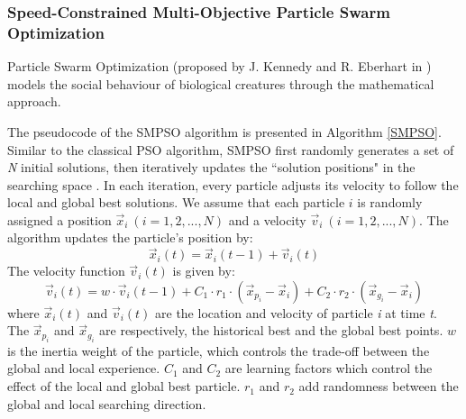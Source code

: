 \documentclass[10pt,journal,compsoc]{IEEEtran}
\begin{document}
\subsubsection{Speed-Constrained Multi-Objective Particle Swarm Optimization}
Particle Swarm Optimization (proposed by J. Kennedy and R. Eberhart in \cite{poli2017}) models the social behaviour of biological creatures through the mathematical approach.

The pseudocode of the SMPSO algorithm is presented in Algorithm \ref{SMPSO}.
Similar to the classical PSO algorithm, SMPSO first randomly generates a set of \textit{N} initial solutions, then iteratively updates the ``solution positions" in the searching space \cite{smpso}.
In each iteration, every particle adjusts its velocity to follow the local and global best solutions. We assume that each particle $i$ is randomly assigned a position $\vec{x}_i\ (i=1, 2, ..., N)$ and a velocity $\vec{v}_i\ (i=1,2,...,N)$. The algorithm updates the particle's position by:
\begin{equation}\label{psoposition}
\vec{x}_i(t) = \vec{x}_i(t-1) + \vec{v}_i(t)
\end{equation}
The velocity function $\vec{v}_i(t)$ is given by:
\begin{equation}\label{psospeed}
\vec{v}_i(t) = w \cdot \vec{v}_i(t-1) + C_1 \cdot r_1 \cdot (\vec{x}_{p_i}- \vec{x}_i)+ C_2 \cdot r_2 \cdot (\vec{x}_{g_i} - \vec{x}_i)
\end{equation}
where $\vec{x}_i(t)$ and $\vec{v}_i(t)$ are the location and velocity of particle \textit{i} at time \textit{t}. 
The $\vec{x}_{p_i}$ and $\vec{x}_{g_i}$ are respectively, the historical best and the global best points.
$w$ is the inertia weight of the particle, which controls the trade-off between the global and local experience.
$C_1$ and $C_2$ are learning factors which control the effect of the local and global best particle.
$r_1$ and $r_2 $ add randomness between the global and local searching direction.
\end{document}
